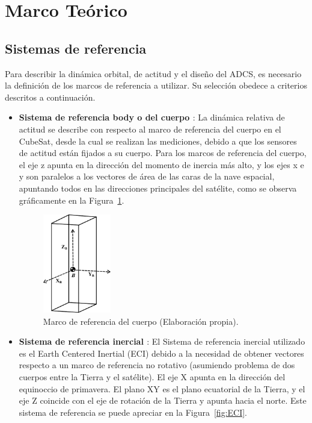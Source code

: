 \section{Marco Teórico}

\subsection{Sistemas de referencia}

Para describir la dinámica orbital, de actitud y el diseño del ADCS, es necesario la definición de los marcos de referencia a utilizar. Su selección obedece a criterios descritos a continuación.

\begin{itemize}
	\item \textbf{Sistema de referencia body o del cuerpo \cite{ref21}}: La dinámica relativa de actitud se describe con respecto al marco de referencia del cuerpo en el CubeSat, desde la cual se realizan las mediciones, debido a que los sensores de actitud están fijados a su cuerpo. Para los marcos de referencia del cuerpo, el eje z apunta en la dirección del momento de inercia más alto, y los ejes x e y son paralelos a los vectores de área de las caras de la nave espacial, apuntando todos en las direcciones principales del satélite, como se observa gráficamente en la Figura~\ref{fig:body}.
	
	\begin{figure}[h]
		\centering    
		\includegraphics[width=0.28\textwidth]{body.pdf}
		\caption{Marco de referencia del cuerpo (Elaboración propia).}
		\label{fig:body}
	\end{figure}
	
	\item \textbf{Sistema de referencia inercial \cite{ref21,ref22}}: El Sistema de referencia inercial utilizado es el Earth Centered Inertial (ECI) debido a la necesidad de obtener vectores respecto a un marco de referencia no rotativo (asumiendo problema de dos cuerpos entre la Tierra y el satélite). El eje X apunta en la dirección del equinoccio de primavera. El plano XY es el plano ecuatorial de la Tierra, y el eje Z coincide con el eje de rotación de la Tierra y apunta hacia el norte. Este sistema de referencia se puede apreciar en la Figura~\ref{fig:ECI}.
	

\end{itemize}

